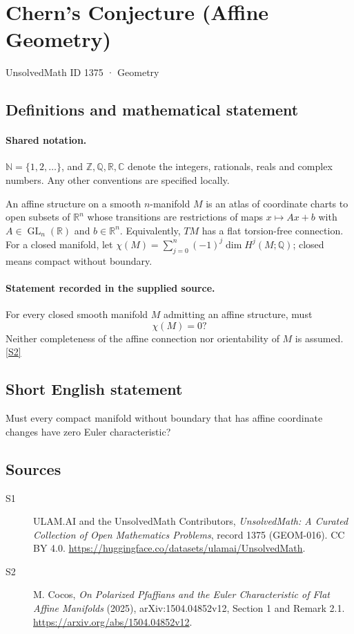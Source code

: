 \documentclass[11pt]{article}
\newcommand{\sref}[2]{\hyperlink{source:#1:#2}{[S#2]}}
\begin{document}
\setcounter{section}{1374}
\section{Chern's Conjecture (Affine Geometry)}\label{1375}
{\small\sffamily UnsolvedMath ID 1375 · Geometry}
\subsection{Definitions and mathematical statement}

\paragraph{Shared notation.}$\mathbb N=\{1,2,\ldots\}$, and $\mathbb Z,\mathbb Q,\mathbb R,\mathbb C$ denote the integers, rationals, reals and complex numbers. Any other conventions are specified locally.


An affine structure on a smooth $n$-manifold $M$ is an atlas of coordinate charts to open subsets of $\mathbb R^n$ whose transitions are restrictions of maps $x\mapsto Ax+b$ with $A\in\operatorname{GL}_n(\mathbb R)$ and $b\in\mathbb R^n$. Equivalently, $TM$ has a flat torsion-free connection. For a closed manifold, let $\chi(M)=\sum_{j=0}^{n}(-1)^j\dim H^j(M;\mathbb Q)$; closed means compact without boundary.
\paragraph{Statement recorded in the supplied source.}
For every closed smooth manifold $M$ admitting an affine structure, must
\[
 \chi(M)=0?
\]
Neither completeness of the affine connection nor orientability of $M$ is assumed. \sref{1375}{2}
\subsection{Short English statement}
Must every compact manifold without boundary that has affine coordinate changes have zero Euler characteristic?
\subsection{Sources}
\begin{description}
\item[\hypertarget{source:1375:1}{S1}] ULAM.AI and the UnsolvedMath Contributors, \emph{UnsolvedMath: A Curated Collection of Open Mathematics Problems}, record 1375 (GEOM-016). CC BY 4.0. \url{https://huggingface.co/datasets/ulamai/UnsolvedMath}.
\item[\hypertarget{source:1375:2}{S2}] M. Cocos, \emph{On Polarized Pfaffians and the Euler Characteristic of Flat Affine Manifolds} (2025), arXiv:1504.04852v12, Section 1 and Remark 2.1. \url{https://arxiv.org/abs/1504.04852v12}.
\end{description}
\label{end:1375}
\end{document}

